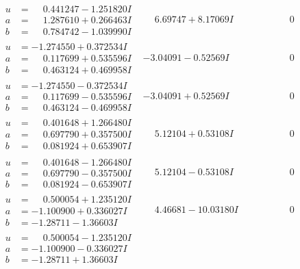 \documentclass[1p]{elsarticle_modified}
\theoremstyle{definition}
\begin{document}
$$\begin{array}{c|c|c}
\begin{aligned}
u &= \phantom{-}0.441247 - 1.251820 I \\
a &= \phantom{-}1.287610 + 0.266463 I \\
b &= \phantom{-}0.784742 - 1.039990 I\end{aligned}
 & \phantom{-}6.69747 + 8.17069 I & \phantom{-0.000000 } 0 \\ \hline\begin{aligned}
u &= -1.274550 + 0.372534 I \\
a &= \phantom{-}0.117699 + 0.535596 I \\
b &= \phantom{-}0.463124 + 0.469958 I\end{aligned}
 & -3.04091 - 0.52569 I & \phantom{-0.000000 } 0 \\ \hline\begin{aligned}
u &= -1.274550 - 0.372534 I \\
a &= \phantom{-}0.117699 - 0.535596 I \\
b &= \phantom{-}0.463124 - 0.469958 I\end{aligned}
 & -3.04091 + 0.52569 I & \phantom{-0.000000 } 0 \\ \hline\begin{aligned}
u &= \phantom{-}0.401648 + 1.266480 I \\
a &= \phantom{-}0.697790 + 0.357500 I \\
b &= \phantom{-}0.081924 + 0.653907 I\end{aligned}
 & \phantom{-}5.12104 + 0.53108 I & \phantom{-0.000000 } 0 \\ \hline\begin{aligned}
u &= \phantom{-}0.401648 - 1.266480 I \\
a &= \phantom{-}0.697790 - 0.357500 I \\
b &= \phantom{-}0.081924 - 0.653907 I\end{aligned}
 & \phantom{-}5.12104 - 0.53108 I & \phantom{-0.000000 } 0 \\ \hline\begin{aligned}
u &= \phantom{-}0.500054 + 1.235120 I \\
a &= -1.100900 + 0.336027 I \\
b &= -1.28711 - 1.36603 I\end{aligned}
 & \phantom{-}4.46681 - 10.03180 I & \phantom{-0.000000 } 0 \\ \hline\begin{aligned}
u &= \phantom{-}0.500054 - 1.235120 I \\
a &= -1.100900 - 0.336027 I \\
b &= -1.28711 + 1.36603 I\end{aligned}

\end{array}$$
\end{document}
